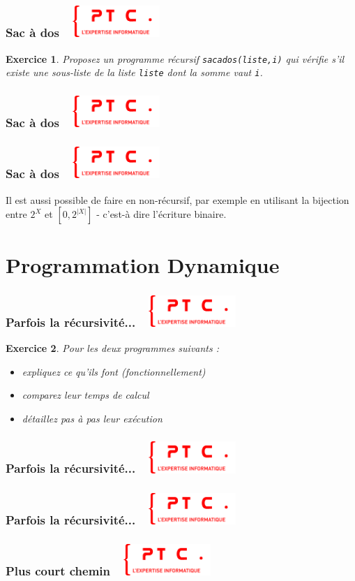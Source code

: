 \documentclass[11pt]{beamer}
\newenvironment{slide}[1]{%
\begin{frame}[environment=slide]
\frametitle{#1~\hfill~\includegraphics[height=1.2cm]{./epitech.png}}
}{%
\end{frame}
}
\newtheorem{exercice}{Exercice}
\newcommand{\Python}[1]{
	{\small	}
}
\begin{document}
\begin{slide}{Sac à dos}
\begin{exercice}
Proposez un programme récursif \texttt{sacados(liste,i)} qui vérifie s'il existe une sous-liste de la liste \texttt{liste} dont la somme vaut \texttt{i}.
\end{exercice}
\end{slide}

\begin{slide}{Sac à dos}
\Python{recdouble}
\end{slide}

\begin{slide}{Sac à dos}
Il est aussi possible de faire en non-récursif, par exemple en utilisant la bijection entre $2^X$ et $[0,2^{|X|}]$ - c'est-à dire l'écriture binaire.
\end{slide}

\section{Programmation Dynamique}

\begin{slide}{Parfois la récursivité...}
\begin{exercice}
Pour les deux programmes suivants :
\begin{itemize}
	\item expliquez ce qu'ils font (fonctionnellement)
	\item comparez leur temps de calcul
	\item détaillez pas à pas leur exécution
\end{itemize}
\end{exercice}
\end{slide}

\begin{slide}{Parfois la récursivité...}
\Python{longrec}
\end{slide}

\begin{slide}{Parfois la récursivité...}
\Python{longdyn}
\end{slide}

\begin{slide}{Plus court chemin}
\begin{center}
\end{center}
\end{slide}
\end{document}
